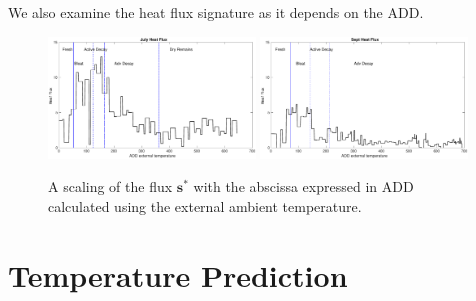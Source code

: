 \documentclass{beamer}
\begin{document}
\begin{frame}
  We also examine the heat flux signature as it depends on the ADD.
  \begin{figure}
\includegraphics[width=0.49\textwidth]{Figures/jul_addex}
\includegraphics[width=0.49\textwidth]{Figures/sept_addex}
\caption{A scaling of the flux $\mathbf{s}^*$ with the 
abscissa expressed in ADD calculated using the external 
ambient temperature.}
\label{fig:s-fun-ADD}
\end{figure}
\end{frame}

\section{Temperature Prediction}
\end{document}
